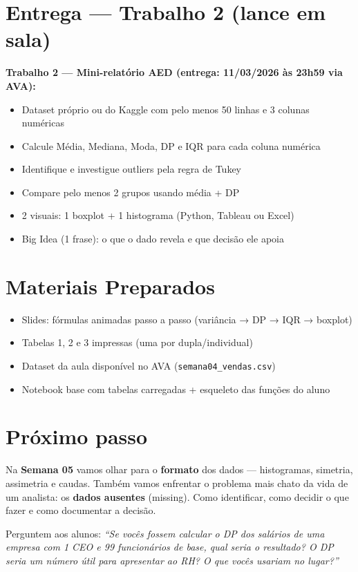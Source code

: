\section{Entrega — Trabalho 2 (lance em sala)}

\begin{SolvedBox}
\textbf{Trabalho 2 — Mini-relatório AED (entrega: 11/03/2026 às 23h59 via AVA):}
\begin{itemize}
  \item[$\square$] Dataset próprio ou do Kaggle com pelo menos 50 linhas e 3 colunas numéricas
  \item[$\square$] Calcule Média, Mediana, Moda, DP e IQR para cada coluna numérica
  \item[$\square$] Identifique e investigue outliers pela regra de Tukey
  \item[$\square$] Compare pelo menos 2 grupos usando média + DP
  \item[$\square$] 2 visuais: 1 boxplot + 1 histograma (Python, Tableau ou Excel)
  \item[$\square$] Big Idea (1 frase): o que o dado revela e que decisão ele apoia
\end{itemize}
\end{SolvedBox}

\section{Materiais Preparados}
\begin{itemize}
  \item Slides: fórmulas animadas passo a passo (variância → DP → IQR → boxplot)
  \item Tabelas 1, 2 e 3 impressas (uma por dupla/individual)
  \item Dataset da aula disponível no AVA (\texttt{semana04\_vendas.csv})
  \item Notebook base com tabelas carregadas + esqueleto das funções do aluno
\end{itemize}

\section{Próximo passo}

Na \textbf{Semana 05} vamos olhar para o \textbf{formato} dos dados —
histogramas, simetria, assimetria e caudas. Também vamos enfrentar o problema
mais chato da vida de um analista: os \textbf{dados ausentes} (missing).
Como identificar, como decidir o que fazer e como documentar a decisão.

Perguntem aos alunos: \textit{``Se vocês fossem calcular o DP dos salários
de uma empresa com 1 CEO e 99 funcionários de base, qual seria o resultado?
O DP seria um número útil para apresentar ao RH? O que vocês usariam no lugar?''}
